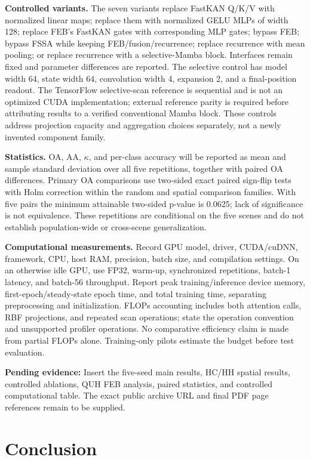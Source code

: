 \documentclass{revision_assets/ieeeaccess_revision}
\newif\ifrevisionhighlights
\newenvironment{revision}{\ifrevisionhighlights\begin{shaded*}\fi}{\ifrevisionhighlights\end{shaded*}\fi}
\newcommand{\pending}[1]{\textcolor{red!70!black}{\textbf{Pending evidence:} #1}}
\begin{document}
\begin{revision}
\textbf{Controlled variants.} The seven variants replace FastKAN Q/K/V with normalized linear maps; replace them with normalized GELU MLPs of width 128; replace FEB's FastKAN gates with corresponding MLP gates; bypass FEB; bypass FSSA while keeping FEB/fusion/recurrence; replace recurrence with mean pooling; or replace recurrence with a selective-Mamba block. Interfaces remain fixed and parameter differences are reported. The selective control has model width 64, state width 64, convolution width 4, expansion 2, and a final-position readout. The TensorFlow selective-scan reference is sequential and is not an optimized CUDA implementation; external reference parity is required before attributing results to a verified conventional Mamba block. These controls address projection capacity and aggregation choices separately, not a newly invented component family.

\textbf{Statistics.} OA, AA, $\kappa$, and per-class accuracy will be reported as mean and sample standard deviation over all five repetitions, together with paired OA differences. Primary OA comparisons use two-sided exact paired sign-flip tests with Holm correction within the random and spatial comparison families. With five pairs the minimum attainable two-sided p-value is 0.0625; lack of significance is not equivalence. These repetitions are conditional on the five scenes and do not establish population-wide or cross-scene generalization.

\textbf{Computational measurements.} Record GPU model, driver, CUDA/cuDNN, framework, CPU, host RAM, precision, batch size, and compilation settings. On an otherwise idle GPU, use FP32, warm-up, synchronized repetitions, batch-1 latency, and batch-56 throughput. Report peak training/inference device memory, first-epoch/steady-state epoch time, and total training time, separating preprocessing and initialization. FLOPs accounting includes both attention calls, RBF projections, and repeated scan operations; state the operation convention and unsupported profiler operations. No comparative efficiency claim is made from partial FLOPs alone. Training-only pilots estimate the budget before test evaluation.

\pending{Insert the five-seed main results, HC/HH spatial results, controlled ablations, QUH FEB analysis, paired statistics, and controlled computational table. The exact public archive URL and final PDF page references remain to be supplied.}
\end{revision}

\section{Conclusion}
\label{sec:conclusion}
\end{document}

